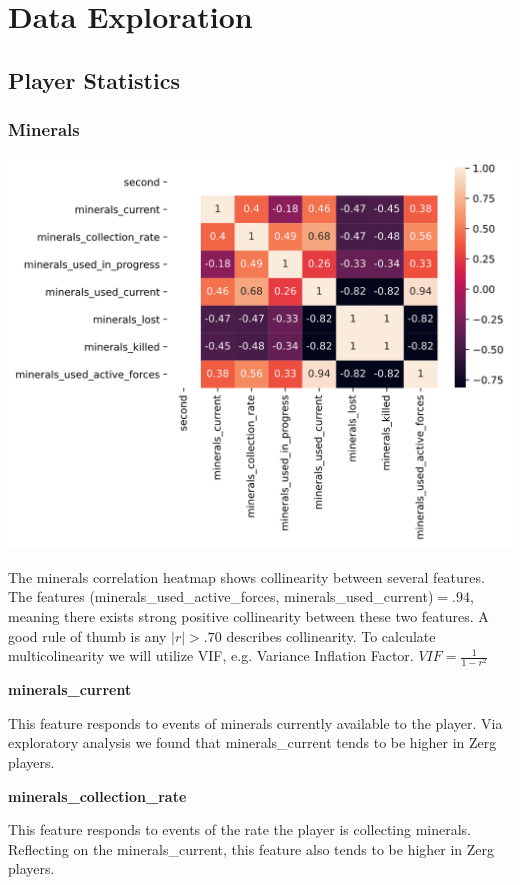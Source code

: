 \documentclass[a4paper,12pt]{report}
\newcommand{\msection}[1]{\noindent\textbf{#1}}
\begin{document}

\section{Data Exploration}

\subsection{Player Statistics}
\subsubsection{Minerals}

\begin{center}
    \captionsetup{type=figure}
    \includegraphics[width=.75\linewidth]{media/minerals_types.png}
\end{center}

The minerals correlation heatmap shows collinearity between several features. The features (minerals\_used\_active\_forces, minerals\_used\_current)$ = .94$, meaning there exists strong positive collinearity between these two features. A good rule of thumb is any $|r| > .70$ describes collinearity. To calculate multicolinearity we will utilize VIF, e.g. Variance Inflation Factor. $VIF = \frac{1}{1-r^2}$

\msection{minerals\_current}

This feature responds to events of minerals currently available to the player. Via exploratory analysis we found that minerals\_current tends to be higher in Zerg players.

\msection{minerals\_collection\_rate}

This feature responds to events of the rate the player is collecting minerals. Reflecting on the minerals\_current, this feature also tends to be higher in Zerg players.
\end{document}
